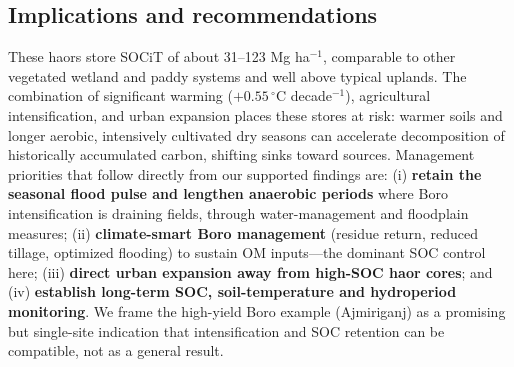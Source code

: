 \documentclass[preprint,authoryear,12pt]{elsarticle}
\begin{document}
\subsection{Implications and recommendations}
\label{subsec:implications}
These haors store SOCiT of about 31--123 Mg ha$^{-1}$, comparable to other vegetated wetland
and paddy systems and well above typical uplands. The combination of significant warming
($+0.55\,^{\circ}$C decade$^{-1}$), agricultural intensification, and urban expansion places
these stores at risk: warmer soils and longer aerobic, intensively cultivated dry seasons can
accelerate decomposition of historically accumulated carbon, shifting sinks toward sources.
Management priorities that follow directly from our supported findings are: (i) \textbf{retain
the seasonal flood pulse and lengthen anaerobic periods} where Boro intensification is draining
fields, through water-management and floodplain measures; (ii) \textbf{climate-smart Boro
management} (residue return, reduced tillage, optimized flooding) to sustain OM inputs---the
dominant SOC control here; (iii) \textbf{direct urban expansion away from high-SOC haor cores};
and (iv) \textbf{establish long-term SOC, soil-temperature and hydroperiod monitoring}. We frame
the high-yield Boro example (Ajmiriganj) as a promising but single-site indication that
intensification and SOC retention can be compatible, not as a general result.

\end{document}
